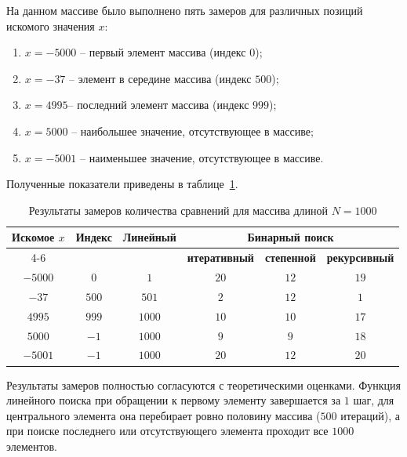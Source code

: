 На данном массиве было выполнено пять замеров
для различных позиций искомого значения $x$:
\begin{enumerate}
    \item $x = -5000$ -- первый элемент массива (индекс $0$);
    \item $x = -37$ -- элемент в середине массива (индекс $500$);
    \item $x = 4995$-- последний элемент массива (индекс $999$);
    \item $x = 5000$ -- наибольшее значение, отсутствующее в массиве;
    \item $x = -5001$ -- наименьшее значение, отсутствующее в массиве.
\end{enumerate}

Полученные показатели приведены в таблице~\ref{tab:exp_results}.

\begin{table}[h!]
    \centering
    \small
    \setlength{\tabcolsep}{4pt}
    \begin{threeparttable}
        \caption{Результаты замеров количества сравнений для массива длиной $N = 1000$}
        \label{tab:exp_results}
        \begin{tabular}{|c|c|c|c|c|c|}
            \hline
            \multirow{2}{*}{\textbf{Искомое $x$}} & \multirow{2}{*}{\textbf{Индекс}} & \multirow{2}{*}{\textbf{Линейный}} & \multicolumn{3}{c|}{\textbf{Бинарный поиск}} \\
            \cline{4-6}
             & & & \textbf{итеративный} & \textbf{степенной} & \textbf{рекурсивный} \\
            \hline
            $-5000$ & $0$ & $1$ & $20$ & $12$ & $19$ \\
            \hline
            $-37$ & $500$ & $501$ & $2$ & $12$ & $1$ \\
            \hline
            $4995$ & $999$ & $1000$ & $10$ & $10$ & $17$ \\
            \hline
            $5000$ & $-1$ & $1000$ & $9$ & $9$ & $18$ \\
            \hline
            $-5001$ & $-1$ & $1000$ & $20$ & $12$ & $20$ \\
            \hline
        \end{tabular}
    \end{threeparttable}
\end{table}

Результаты замеров полностью согласуются с теоретическими оценками. 
Функция линейного поиска при обращении к первому элементу завершается 
за $1$ шаг, для центрального элемента она перебирает 
ровно половину массива ($500$ итераций), а при поиске 
последнего или отсутствующего элемента проходит все $1000$ элементов.

